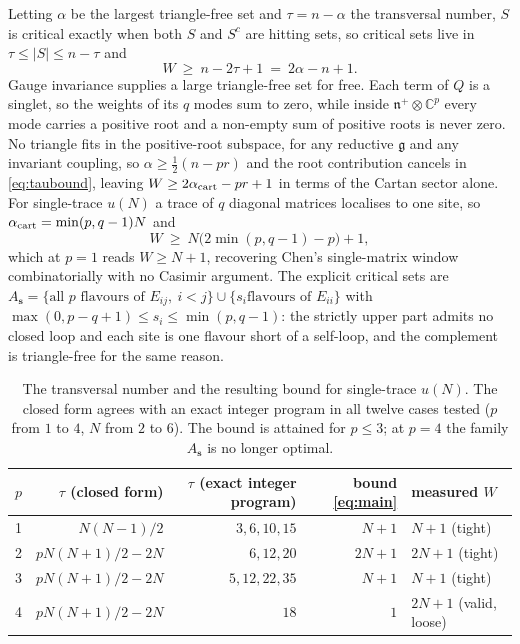 \documentclass[10pt]{article}
\newcommand{\g}{\mathfrak{g}}
\newcommand{\n}{\mathfrak{n}}
\begin{document}
Letting $\alpha$ be the largest triangle-free set and $\tau=n-\alpha$ the transversal number, $S$ is critical
exactly when both $S$ and $S^c$ are hitting sets, so critical sets live in $\tau\le|S|\le n-\tau$ and
\begin{equation}
W\ \ge\ n-2\tau+1\ =\ 2\alpha-n+1 .
\label{eq:taubound}
\end{equation}
Gauge invariance supplies a large triangle-free set for free. Each term of $Q$ is a singlet, so the weights of
its $q$ modes sum to zero, while inside $\n^+\otimes\mathbb C^p$ every mode carries a positive root and a
non-empty sum of positive roots is never zero. No triangle fits in the positive-root subspace, for any reductive
$\g$ and any invariant coupling, so $\alpha\ge\frac12(n-pr)$ and the root contribution cancels in
\eqref{eq:taubound}, leaving $W\ge2\alpha_{\rm cart}-pr+1$ in terms of the Cartan sector alone. For single-trace
$u(N)$ a trace of $q$ diagonal matrices localises to one site, so $\alpha_{\rm cart}=\min(p,q-1)N$ and
\begin{equation}
W\ \ge\ N\big(2\min(p,q-1)-p\big)+1 ,
\label{eq:main}
\end{equation}
which at $p=1$ reads $W\ge N+1$, recovering Chen's single-matrix window combinatorially with no Casimir argument.
The explicit critical sets are $A_{\mathbf s}=\{\text{all }p\text{ flavours of }E_{ij},\ i<j\}\cup\{s_i\text{
flavours of }E_{ii}\}$ with $\max(0,p-q+1)\le s_i\le\min(p,q-1)$: the strictly upper part admits no closed loop
and each site is one flavour short of a self-loop, and the complement is triangle-free for the same reason.

\begin{table}[t]\centering\small
\begin{tabular}{lrrrl}
\toprule
$p$ & $\tau$ (closed form) & $\tau$ (exact integer program) & bound \eqref{eq:main} & measured $W$\\
\midrule
1 & $N(N-1)/2$ & $3,6,10,15$ & $N+1$ & $N+1$ \quad(tight)\\
2 & $pN(N+1)/2-2N$ & $6,12,20$ & $2N+1$ & $2N+1$ \quad(tight)\\
3 & $pN(N+1)/2-2N$ & $5,12,22,35$ & $N+1$ & $N+1$ \quad(tight)\\
4 & $pN(N+1)/2-2N$ & $18$ & $1$ & $2N+1$ \quad(valid, loose)\\
\bottomrule
\end{tabular}
\caption{The transversal number and the resulting bound for single-trace $u(N)$. The closed form agrees with an
exact integer program in all twelve cases tested ($p$ from $1$ to $4$, $N$ from $2$ to $6$). The bound is
attained for $p\le3$; at $p=4$ the family $A_{\mathbf s}$ is no longer optimal.}
\label{tab:tau}
\end{table}
\end{document}
